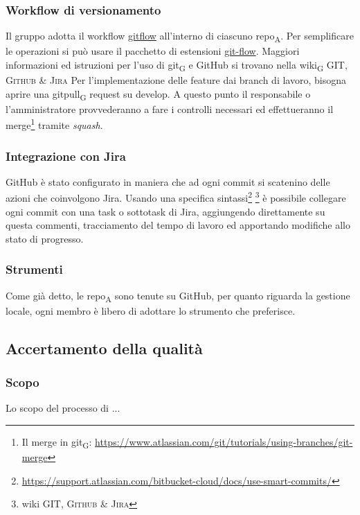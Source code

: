     \subsubsection{Workflow di versionamento}
        Il gruppo adotta il workflow \href{https://www.atlassian.com/git/tutorials/comparing-workflows/gitflow-workflow}{gitflow} all'interno di ciascuno \acrshort{repo}\textsubscript{A}. Per semplificare le operazioni si può usare il pacchetto di estensioni \href{http://danielkummer.github.io/git-flow-cheatsheet/}{git-flow}. Maggiori informazioni ed istruzioni per l'uso di \gls{git}\textsubscript{G} e GitHub si trovano nella \gls{wiki}\textsubscript{G} \textsc{GIT, Github \& Jira}
            Per l'implementazione delle feature dai branch di lavoro, bisogna aprire una \gls{gitpull}\textsubscript{G} request su develop. A questo punto il responsabile o l'amministratore provvederanno a fare i controlli necessari ed effettueranno il merge\footnote{Il merge in \gls{git}\textsubscript{G}: \url{https://www.atlassian.com/git/tutorials/using-branches/git-merge}} tramite \textit{squash}.

    \subsubsection{Integrazione con Jira}
    \label{jiraintegration}
        GitHub è stato configurato in maniera che ad ogni commit si scatenino delle azioni che coinvolgono Jira. Usando una specifica sintassi\footnote{\url{https://support.atlassian.com/bitbucket-cloud/docs/use-smart-commits/}} \footnote{wiki \textsc{GIT, Github \& Jira}} è possibile collegare ogni commit con una task o sottotask di Jira, aggiungendo direttamente su questa commenti, tracciamento del tempo di lavoro ed apportando modifiche allo stato di progresso.

    \subsubsection{Strumenti}
        Come già detto, le \acrshort{repo}\textsubscript{A} sono tenute su GitHub, per quanto riguarda la gestione locale, ogni membro è libero di adottare lo strumento che preferisce.

\subsection{Accertamento della qualità} %
    \subsubsection{Scopo}
        Lo scopo del processo di ...
